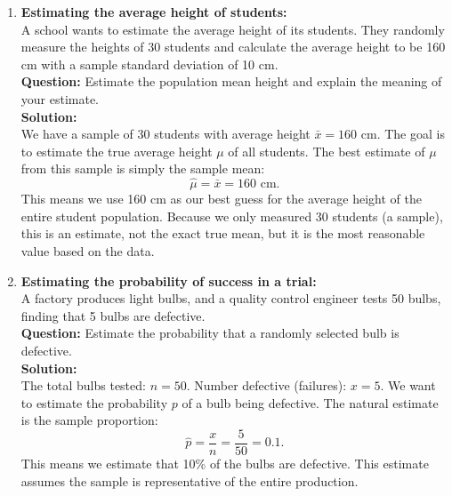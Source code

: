 \documentclass{book}
\begin{document}
\begin{enumerate}[label=Exercise \arabic*:]
    \item \textbf{Estimating the average height of students:} \\
    A school wants to estimate the average height of its students. They randomly measure the heights of 30 students and calculate the average height to be 160 cm with a sample standard deviation of 10 cm. \\
    \textbf{Question:} Estimate the population mean height and explain the meaning of your estimate. \\
    \textbf{Solution:} \\
    We have a sample of 30 students with average height \(\bar{x} = 160\) cm. The goal is to estimate the true average height \(\mu\) of all students. The best estimate of \(\mu\) from this sample is simply the sample mean:
    \[
    \hat{\mu} = \bar{x} = 160 \text{ cm}.
    \]
    This means we use 160 cm as our best guess for the average height of the entire student population. Because we only measured 30 students (a sample), this is an estimate, not the exact true mean, but it is the most reasonable value based on the data.

    \item \textbf{Estimating the probability of success in a trial:} \\
    A factory produces light bulbs, and a quality control engineer tests 50 bulbs, finding that 5 bulbs are defective. \\
    \textbf{Question:} Estimate the probability that a randomly selected bulb is defective. \\
    \textbf{Solution:} \\
    The total bulbs tested: \(n = 50\). Number defective (failures): \(x = 5\). We want to estimate the probability \(p\) of a bulb being defective. The natural estimate is the sample proportion:
    \[
    \hat{p} = \frac{x}{n} = \frac{5}{50} = 0.1.
    \]
    This means we estimate that 10\% of the bulbs are defective. This estimate assumes the sample is representative of the entire production.


\end{enumerate}
\end{document}
